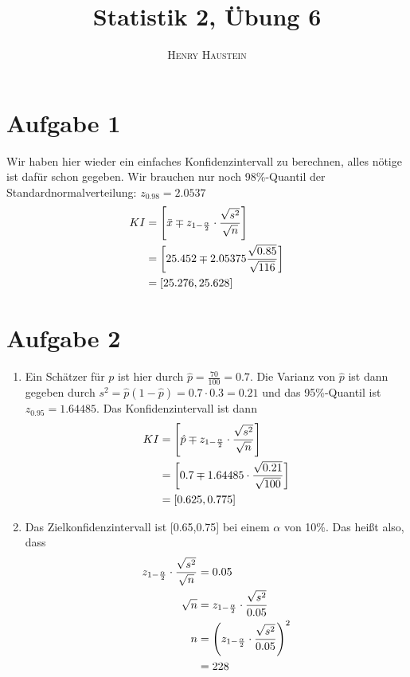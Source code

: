 \documentclass{article}
\title{\textbf{Statistik 2, Übung 6}}
\author{\textsc{Henry Haustein}}
\date{}
\begin{document}
	\maketitle
	
	\section*{Aufgabe 1}
	Wir haben hier wieder ein einfaches Konfidenzintervall zu berechnen, alles nötige ist dafür schon gegeben. Wir brauchen nur noch 98\%-Quantil der Standardnormalverteilung: $z_{0.98}=2.0537$
	\begin{align}
		KI &= \left[\bar{x} \mp z_{1-\frac{\alpha}{2}}\cdot\frac{\sqrt{s^2}}{\sqrt{n}}\right] \notag \\
		&= \left[25.452 \mp 2.05375\frac{\sqrt{0.85}}{\sqrt{116}}\right] \notag \\
		&= [25.276,25.628] \notag
	\end{align}
	
	\section*{Aufgabe 2}
	\begin{enumerate}[label=(\alph*)]
		\item Ein Schätzer für $p$ ist hier durch $\hat{p}=\frac{70}{100}=0.7$. Die Varianz von $\hat{p}$ ist dann gegeben durch $s^2 = \hat{p}(1-\hat{p})=0.7\cdot 0.3=0.21$ und das 95\%-Quantil ist $z_{0.95}=1.64485$. Das Konfidenzintervall ist dann
		\begin{align}
			KI &= \left[\hat{p} \mp z_{1-\frac{\alpha}{2}}\cdot\frac{\sqrt{s^2}}{\sqrt{n}}\right] \notag \\
			&= \left[0.7 \mp 1.64485\cdot\frac{\sqrt{0.21}}{\sqrt{100}}\right] \notag \\
			&= [0.625,0.775] \notag
		\end{align}
		\item Das Zielkonfidenzintervall ist [0.65,0.75] bei einem $\alpha$ von 10\%. Das heißt also, dass
		\begin{align}
			z_{1-\frac{\alpha}{2}}\cdot\frac{\sqrt{s^2}}{\sqrt{n}} &= 0.05 \notag \\
			\sqrt{n} &= z_{1-\frac{\alpha}{2}}\cdot\frac{\sqrt{s^2}}{0.05} \notag \\
			n &= \left(z_{1-\frac{\alpha}{2}}\cdot\frac{\sqrt{s^2}}{0.05}\right)^2 \notag \\
			&= 228 \notag
		\end{align}
	\end{enumerate}
\end{document}
